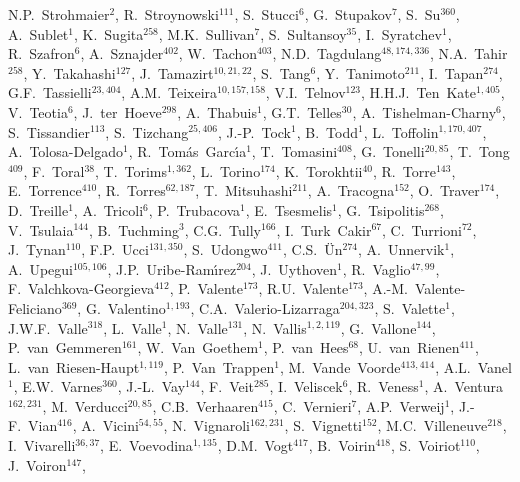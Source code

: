 N.P.~Strohmaier$^{{2}}$,
R.~Stroynowski$^{{111}}$,
S.~Stucci$^{{6}}$,
G.~Stupakov$^{{7}}$,
S.~Su$^{{360}}$,
A.~Sublet$^{{1}}$,
K.~Sugita$^{{258}}$,
M.K.~Sullivan$^{{7}}$,
S.~Sultansoy$^{{35}}$,
I.~Syratchev$^{{1}}$,
R.~Szafron$^{{6}}$,
A.~Sznajder$^{{402}}$,
W.~Tachon$^{{403}}$,
N.D.~Tagdulang$^{{48, 174, 336}}$,
N.A.~Tahir$^{{258}}$,
Y.~Takahashi$^{{127}}$,
J.~Tamazirt$^{{10, 21, 22}}$,
S.~Tang$^{{6}}$,
Y.~Tanimoto$^{{211}}$,
I.~Tapan$^{{274}}$,
G.F.~Tassielli$^{{23, 404}}$,
A.M.~Teixeira$^{{10, 157, 158}}$,
V.I.~Telnov$^{{123}}$,
H.H.J.~Ten~Kate$^{{1, 405}}$,
V.~Teotia$^{{6}}$,
J.~ter~Hoeve$^{{298}}$,
A.~Thabuis$^{{1}}$,
G.T.~Telles$^{{30}}$,
A.~Tishelman-Charny$^{{6}}$,
S.~Tissandier$^{{113}}$,
S.~Tizchang$^{{25, 406}}$,
J.-P.~Tock$^{{1}}$,
B.~Todd$^{{1}}$,
L.~Toffolin$^{{1, 170, 407}}$,
A.~Tolosa-Delgado$^{{1}}$,
R.~Tom{\'a}s~Garc{\'\i}a$^{{1}}$,
T.~Tomasini$^{{408}}$,
G.~Tonelli$^{{20, 85}}$,
T.~Tong$^{{409}}$,
F.~Toral$^{{38}}$,
T.~Torims$^{{1, 362}}$,
L.~Torino$^{{174}}$,
K.~Torokhtii$^{{40}}$,
R.~Torre$^{{143}}$,
E.~Torrence$^{{410}}$,
R.~Torres$^{{62, 187}}$,
T.~Mitsuhashi$^{{211}}$,
A.~Tracogna$^{{152}}$,
O.~Traver$^{{174}}$,
D.~Treille$^{{1}}$,
A.~Tricoli$^{{6}}$,
P.~Trubacova$^{{1}}$,
E.~Tsesmelis$^{{1}}$,
G.~Tsipolitis$^{{268}}$,
V.~Tsulaia$^{{144}}$,
B.~Tuchming$^{{3}}$,
C.G.~Tully$^{{166}}$,
I.~Turk~Cakir$^{{67}}$,
C.~Turrioni$^{{72}}$,
J.~Tynan$^{{110}}$,
F.P.~Ucci$^{{131, 350}}$,
S.~Udongwo$^{{411}}$,
C.S.~{\"U}n$^{{274}}$,
A.~Unnervik$^{{1}}$,
A.~Upegui$^{{105, 106}}$,
J.P.~Uribe-Ram{\'\i}rez$^{{204}}$,
J.~Uythoven$^{{1}}$,
R.~Vaglio$^{{47, 99}}$,
F.~Valchkova-Georgieva$^{{412}}$,
P.~Valente$^{{173}}$,
R.U.~Valente$^{{173}}$,
A.-M.~Valente-Feliciano$^{{369}}$,
G.~Valentino$^{{1, 193}}$,
C.A.~Valerio-Lizarraga$^{{204, 323}}$,
S.~Valette$^{{1}}$,
J.W.F.~Valle$^{{318}}$,
L.~Valle$^{{1}}$,
N.~Valle$^{{131}}$,
N.~Vallis$^{{1, 2, 119}}$,
G.~Vallone$^{{144}}$,
P.~van~Gemmeren$^{{161}}$,
W.~Van~Goethem$^{{1}}$,
P.~van~Hees$^{{68}}$,
U.~van~Rienen$^{{411}}$,
L.~van~Riesen-Haupt$^{{1, 119}}$,
P.~Van~Trappen$^{{1}}$,
M.~Vande~Voorde$^{{413, 414}}$,
A.L.~Vanel$^{{1}}$,
E.W.~Varnes$^{{360}}$,
J.-L.~Vay$^{{144}}$,
F.~Veit$^{{285}}$,
I.~Veliscek$^{{6}}$,
R.~Veness$^{{1}}$,
A.~Ventura$^{{162, 231}}$,
M.~Verducci$^{{20, 85}}$,
C.B.~Verhaaren$^{{415}}$,
C.~Vernieri$^{{7}}$,
A.P.~Verweij$^{{1}}$,
J.-F.~Vian$^{{416}}$,
A.~Vicini$^{{54, 55}}$,
N.~Vignaroli$^{{162, 231}}$,
S.~Vignetti$^{{152}}$,
M.C.~Villeneuve$^{{218}}$,
I.~Vivarelli$^{{36, 37}}$,
E.~Voevodina$^{{1, 135}}$,
D.M.~Vogt$^{{417}}$,
B.~Voirin$^{{418}}$,
S.~Voiriot$^{{110}}$,
J.~Voiron$^{{147}}$,
